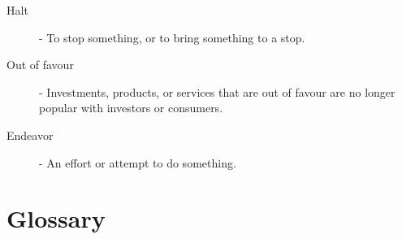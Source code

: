 \documentclass[a4paper,12pt]{article}
\begin{document}
\begin{description}


\item[Halt] - To stop something, or to bring something to a stop.

\item[Out of favour] - Investments, products, or services that are out of favour are no longer popular with investors or consumers.



\item[Endeavor] - An effort or attempt to do something.

\end{description}

\section{Glossary}
\end{document}
